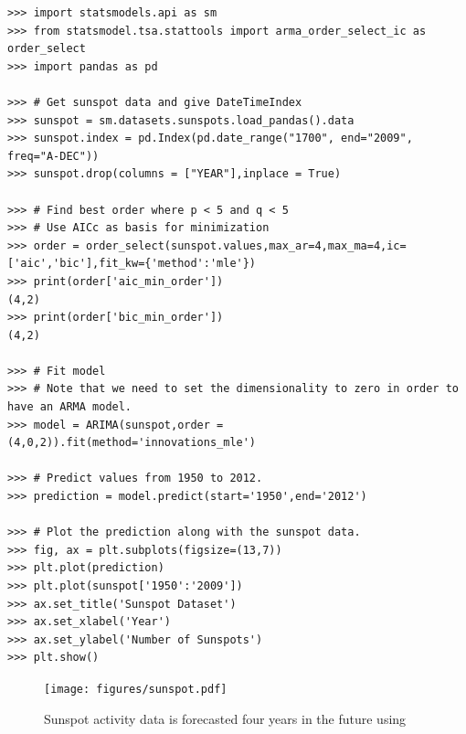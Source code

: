 \begin{lstlisting}
>>> import statsmodels.api as sm
>>> from statsmodel.tsa.stattools import arma_order_select_ic as order_select
>>> import pandas as pd

>>> # Get sunspot data and give DateTimeIndex
>>> sunspot = sm.datasets.sunspots.load_pandas().data
>>> sunspot.index = pd.Index(pd.date_range("1700", end="2009", freq="A-DEC"))
>>> sunspot.drop(columns = ["YEAR"],inplace = True)

>>> # Find best order where p < 5 and q < 5
>>> # Use AICc as basis for minimization
>>> order = order_select(sunspot.values,max_ar=4,max_ma=4,ic=['aic','bic'],fit_kw={'method':'mle'})
>>> print(order['aic_min_order'])
(4,2)
>>> print(order['bic_min_order'])
(4,2)

>>> # Fit model
>>> # Note that we need to set the dimensionality to zero in order to have an ARMA model.
>>> model = ARIMA(sunspot,order = (4,0,2)).fit(method='innovations_mle')

>>> # Predict values from 1950 to 2012.
>>> prediction = model.predict(start='1950',end='2012')

>>> # Plot the prediction along with the sunspot data.
>>> fig, ax = plt.subplots(figsize=(13,7))
>>> plt.plot(prediction)
>>> plt.plot(sunspot['1950':'2009'])
>>> ax.set_title('Sunspot Dataset')
>>> ax.set_xlabel('Year')
>>> ax.set_ylabel('Number of Sunspots')
>>> plt.show()
\end{lstlisting}


\begin{figure}[H]
\centering
\texttt{[image: figures/sunspot.pdf]}
\caption{Sunspot activity data is forecasted four years in the future using }
\label{fig:sunspot}
\end{figure}

